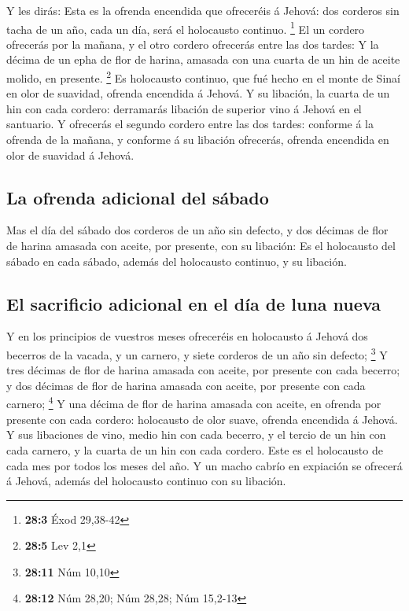  Y les dirás: Esta es la ofrenda encendida que ofreceréis
á Jehová: dos corderos sin tacha de un año, cada un día, será el
holocausto continuo. \footnote{\textbf{28:3} Éxod 29,38-42}
 El un cordero ofrecerás por la mañana, y el otro cordero
ofrecerás entre las dos tardes:  Y la décima de un epha de
flor de harina, amasada con una cuarta de un hin de aceite molido, en
presente. \footnote{\textbf{28:5} Lev 2,1}  Es holocausto
continuo, que fué hecho en el monte de Sinaí en olor de suavidad,
ofrenda encendida á Jehová.  Y su libación, la cuarta de
un hin con cada cordero: derramarás libación de superior vino á Jehová
en el santuario.  Y ofrecerás el segundo cordero entre las
dos tardes: conforme á la ofrenda de la mañana, y conforme á su libación
ofrecerás, ofrenda encendida en olor de suavidad á Jehová.

\hypertarget{la-ofrenda-adicional-del-suxe1bado}{%
\subsection{La ofrenda adicional del
sábado}\label{la-ofrenda-adicional-del-suxe1bado}}

 Mas el día del sábado dos corderos de un año sin defecto,
y dos décimas de flor de harina amasada con aceite, por presente, con su
libación:  Es el holocausto del sábado en cada sábado,
además del holocausto continuo, y su libación.

\hypertarget{el-sacrificio-adicional-en-el-duxeda-de-luna-nueva}{%
\subsection{El sacrificio adicional en el día de luna
nueva}\label{el-sacrificio-adicional-en-el-duxeda-de-luna-nueva}}

 Y en los principios de vuestros meses ofreceréis en
holocausto á Jehová dos becerros de la vacada, y un carnero, y siete
corderos de un año sin defecto; \footnote{\textbf{28:11} Núm 10,10}
 Y tres décimas de flor de harina amasada con aceite, por
presente con cada becerro; y dos décimas de flor de harina amasada con
aceite, por presente con cada carnero; \footnote{\textbf{28:12} Núm
  28,20; Núm 28,28; Núm 15,2-13}  Y una décima de flor de
harina amasada con aceite, en ofrenda por presente con cada cordero:
holocausto de olor suave, ofrenda encendida á Jehová.  Y
sus libaciones de vino, medio hin con cada becerro, y el tercio de un
hin con cada carnero, y la cuarta de un hin con cada cordero. Este es el
holocausto de cada mes por todos los meses del año.  Y un
macho cabrío en expiación se ofrecerá á Jehová, además del holocausto
continuo con su libación.

